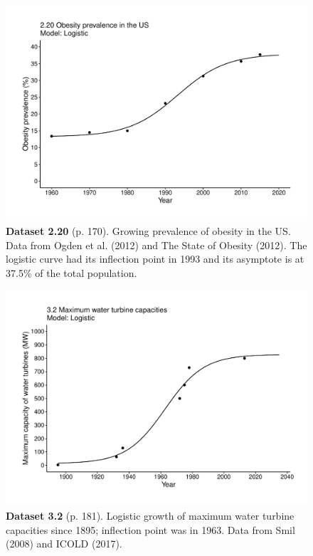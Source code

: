 \documentclass[aps,rmp,preprint,superscriptaddress,10pt,onecolumn]{article}
\begin{document}
\clearpage
\begin{figure}[h]
\includegraphics[width=\textwidth]{output/figs-ggplot/2.20.pdf}
\caption*{\textbf{Dataset 2.20} (p. 170). Growing prevalence of obesity in the US. Data from Ogden et al. (2012) and The State of Obesity (2012). The logistic curve had its inflection point in 1993 and its asymptote is at 37.5\% of the total population.}
\end{figure}
	
\clearpage
\begin{figure}[h]
\includegraphics[width=\textwidth]{output/figs-ggplot/3.2.pdf}
\caption*{\textbf{Dataset 3.2} (p. 181). Logistic growth of maximum water turbine capacities since 1895; inflection point was in 1963. Data from Smil (2008) and ICOLD (2017).}
\end{figure}
	
\end{document}
